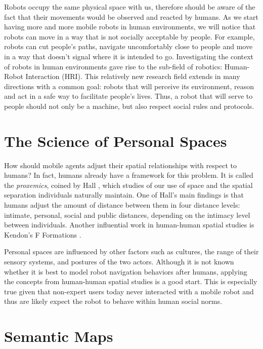 Robots occupy the same physical space with us, therefore should be aware of the fact that their movements would be observed and reacted by humans. As we start having more and more mobile robots in human environments, we will notice that robots can move in a way that is not socially acceptable by people. For example, robots can cut people's paths, navigate uncomfortably close to people and move in a way that doesn't signal where it is intended to go. Investigating the context of robots in human environments gave rise to the sub-field of robotics: Human-Robot Interaction (HRI). This relatively new research field extends in many directions with a common goal: robots that will perceive its environment, reason and act in a safe way to facilitate people's lives. Thus, a robot that will serve to people should not only be a machine, but also respect social rules and protocols.

\section{The Science of Personal Spaces}
\label{sec:personal_spaces}

How should mobile agents adjust their spatial relationships with respect to humans? In fact, humans already have a framework for this problem. It is called the \textit{proxemics}, coined by Hall \cite{hall1966hidden}, which studies of our use of space and the spatial separation individuals naturally maintain. One of Hall's main findings is that humans adjust the amount of distance between them in four distance levels: intimate, personal, social and public distances, depending on the intimacy level between individuals. Another influential work in human-human spatial studies is Kendon's F Formations .

Personal spaces are influenced by other factors such as cultures, the range of their sensory systems, and postures of the two actors. Although it is not known whether it is best to model robot navigation behaviors after humans, applying the concepts from human-human spatial studies is a good start. This is especially true given that non-expert users today never interacted with a mobile robot and thus are likely expect the robot to behave within human social norms.

\section{Semantic Maps}
\label{sec:semantic_maps}

